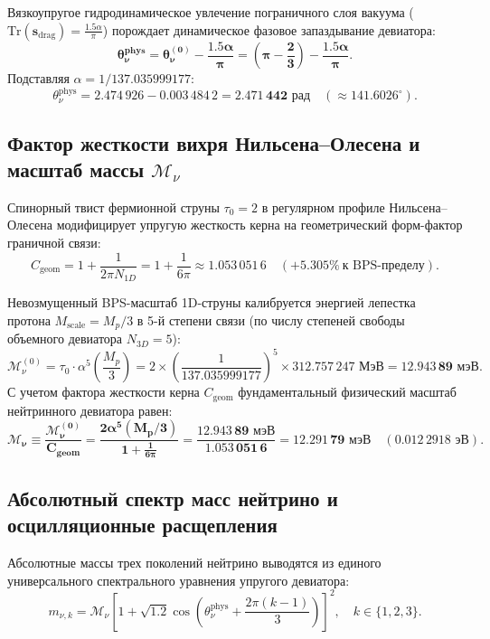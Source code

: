 \documentclass[11pt,a4paper]{article}
\theoremstyle{definition}
\theoremstyle{remark}
\begin{document}
Вязкоупругое гидродинамическое увлечение пограничного слоя вакуума ($\mathrm{Tr}(\mathbf{s}_{\text{drag}}) = \frac{1.5\alpha}{\pi}$) порождает динамическое фазовое запаздывание девиатора:
\begin{equation}
	\mathbf{\theta_\nu^{\text{phys}} = \theta_\nu^{(0)} - \frac{1.5\alpha}{\pi} = \left(\pi - \frac{2}{3}\right) - \frac{1.5\alpha}{\pi}}.
\end{equation}
Подставляя $\alpha = 1/137.035999177$:
\begin{equation}
	\theta_\nu^{\text{phys}} = 2.474\,926 - 0.003\,484\,2 = \mathbf{2.471\,442 \text{ рад}} \quad (\approx 141.6026^\circ).
\end{equation}

\subsection{Фактор жесткости вихря Нильсена--Олесена и масштаб массы $\mathcal{M}_\nu$}
Спинорный твист фермионной струны $\tau_0 = 2$ в регулярном профиле Нильсена--Олесена модифицирует упругую жесткость керна на геометрический форм-фактор граничной связи:
\begin{equation}
	C_{\text{geom}} = 1 + \frac{1}{2\pi N_{1D}} = 1 + \frac{1}{6\pi} \approx 1.053\,051\,6 \quad (\mathbf{+5.305\%} \ \text{к BPS-пределу}).
\end{equation}

Невозмущенный BPS-масштаб 1D-струны калибруется энергией лепестка протона $M_{\text{scale}} = M_p/3$ в 5-й степени связи (по числу степеней свободы объемного девиатора $N_{3D}=5$):
\begin{equation}
	\mathcal{M}_\nu^{(0)} = \tau_0 \cdot \alpha^5 \left( \frac{M_p}{3} \right) = 2 \times \left(\frac{1}{137.035999177}\right)^5 \times 312.757\,247 \text{ МэВ} = \mathbf{12.943\,89 \text{ мэВ}}.
\end{equation}
С учетом фактора жесткости керна $C_{\text{geom}}$ фундаментальный физический масштаб нейтринного девиатора равен:
\begin{equation}
	\mathbf{\mathcal{M}_\nu \equiv \frac{\mathcal{M}_\nu^{(0)}}{C_{\text{geom}}} = \frac{2 \alpha^5 (M_p / 3)}{1 + \frac{1}{6\pi}} = \frac{12.943\,89 \text{ мэВ}}{1.053\,051\,6} = \mathbf{12.291\,79 \text{ мэВ}}} \quad (0.012\,2918 \text{ эВ}).
\end{equation}

\subsection{Абсолютный спектр масс нейтрино и осцилляционные расщепления}
Абсолютные массы трех поколений нейтрино выводятся из единого универсального спектрального уравнения упругого девиатора:
\begin{equation}
	m_{\nu, k} = \mathcal{M}_\nu \left[ 1 + \sqrt{1.2} \cos\left( \theta_\nu^{\text{phys}} + \frac{2\pi(k-1)}{3} \right) \right]^2, \quad k \in \{1, 2, 3\}.
\end{equation}
\end{document}

